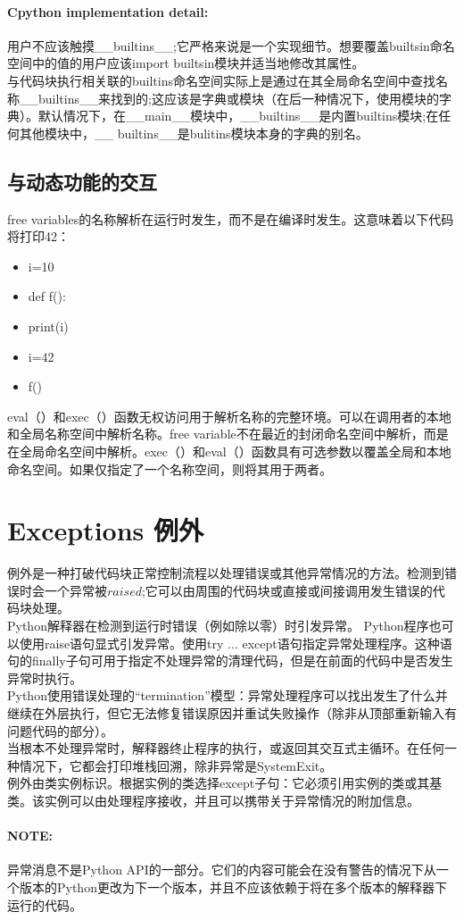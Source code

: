 \documentclass[10pt,UTF8]{ctexart}
\begin{document}
\paragraph{Cpython implementation detail:}用户不应该触摸__builtins__;它严格来说是一个实现细节。想要覆盖builtsin命名空间中的值的用户应该import builtsin模块并适当地修改其属性。\\
\indent 与代码块执行相关联的builtins命名空间实际上是通过在其全局命名空间中查找名称__builtins__来找到的;这应该是字典或模块（在后一种情况下，使用模块的字典）。默认情况下，在__main__模块中，__builtins__是内置builtins模块;在任何其他模块中，__ builtins__是bulitins模块本身的字典的别名。
\subsection{与动态功能的交互}
free variables的名称解析在运行时发生，而不是在编译时发生。这意味着以下代码将打印42：
\begin{itemize}
\item  i=10
\item  def f():
\item  print(i)
\item  i=42
\item  f()
\end{itemize}
\indent eval（）和exec（）函数无权访问用于解析名称的完整环境。可以在调用者的本地和全局名称空间中解析名称。free variable不在最近的封闭命名空间中解析，而是在全局命名空间中解析。exec（）和eval（）函数具有可选参数以覆盖全局和本地命名空间。如果仅指定了一个名称空间，则将其用于两者。
\section{Exceptions 例外}
例外是一种打破代码块正常控制流程以处理错误或其他异常情况的方法。检测到错误时会一个异常被$\mathit{raised}$;它可以由周围的代码块或直接或间接调用发生错误的代码块处理。\\
\indent Python解释器在检测到运行时错误（例如除以零）时引发异常。 Python程序也可以使用raise语句显式引发异常。使用try ... except语句指定异常处理程序。这种语句的finally子句可用于指定不处理异常的清理代码，但是在前面的代码中是否发生异常时执行。\\
\indent Python使用错误处理的“termination”模型：异常处理程序可以找出发生了什么并继续在外层执行，但它无法修复错误原因并重试失败操作（除非从顶部重新输入有问题代码的部分）。\\
\indent 当根本不处理异常时，解释器终止程序的执行，或返回其交互式主循环。在任何一种情况下，它都会打印堆栈回溯，除非异常是SystemExit。\\
\indent 例外由类实例标识。根据实例的类选择except子句：它必须引用实例的类或其基类。该实例可以由处理程序接收，并且可以携带关于异常情况的附加信息。
\paragraph{NOTE:}异常消息不是Python API的一部分。它们的内容可能会在没有警告的情况下从一个版本的Python更改为下一个版本，并且不应该依赖于将在多个版本的解释器下运行的代码。
\end{document}
